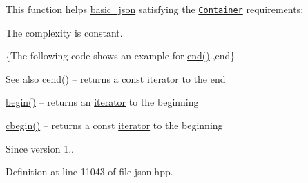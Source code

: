 This function helps {\ttfamily \hyperlink{classnlohmann_1_1basic__json}{basic\+\_\+json}} satisfying the \href{http://en.cppreference.com/w/cpp/concept/Container}{\tt Container} requirements\+:
\begin{DoxyItemize}
\item The complexity is constant.
\end{DoxyItemize}

\{The following code shows an example for {\ttfamily \hyperlink{classnlohmann_1_1basic__json_a13e032a02a7fd8a93fdddc2fcbc4763c}{end()}}.,end\}

\begin{DoxySeeAlso}{See also}
\hyperlink{classnlohmann_1_1basic__json_a8dba7b7d2f38e6b0c614030aa43983f6}{cend()} -- returns a const \hyperlink{classnlohmann_1_1basic__json_a099316232c76c034030a38faa6e34dca}{iterator} to the \hyperlink{classnlohmann_1_1basic__json_a13e032a02a7fd8a93fdddc2fcbc4763c}{end} 

\hyperlink{classnlohmann_1_1basic__json_a0ff28dac23f2bdecee9564d07f51dcdc}{begin()} -- returns an \hyperlink{classnlohmann_1_1basic__json_a099316232c76c034030a38faa6e34dca}{iterator} to the beginning 

\hyperlink{classnlohmann_1_1basic__json_ad865d6c291b237ae508d5cb2146b5877}{cbegin()} -- returns a const \hyperlink{classnlohmann_1_1basic__json_a099316232c76c034030a38faa6e34dca}{iterator} to the beginning
\end{DoxySeeAlso}
\begin{DoxySince}{Since}
version 1.. 
\end{DoxySince}


Definition at line 11043 of file json.\+hpp.


